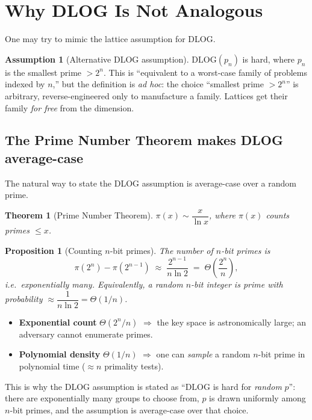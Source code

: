 \documentclass[11pt]{article}
\theoremstyle{definition}
\newtheorem{assumption}[definition]{Assumption}
\theoremstyle{plain}
\newtheorem{theorem}[definition]{Theorem}
\newtheorem{proposition}[definition]{Proposition}
\theoremstyle{remark}
\newcommand{\dlog}{\mathrm{DLOG}}
\begin{document}
\section{Why DLOG Is Not Analogous}

One may try to mimic the lattice assumption for DLOG.

\begin{assumption}[Alternative DLOG assumption]
$\dlog(p_n)$ is hard, where $p_n$ is the smallest prime $>2^n$. This is ``equivalent to a
worst-case family of problems indexed by $n$,'' but the definition is \emph{ad hoc}: the
choice ``smallest prime $>2^n$'' is arbitrary, reverse-engineered only to manufacture a
family. Lattices get their family \emph{for free} from the dimension.
\end{assumption}

\subsection{The Prime Number Theorem makes DLOG average-case}
\label{sec:pnt}

The natural way to state the DLOG assumption is average-case over a random prime.

\begin{theorem}[Prime Number Theorem]
$\pi(x) \sim \dfrac{x}{\ln x}$, where $\pi(x)$ counts primes $\le x$.
\end{theorem}

\begin{proposition}[Counting $n$-bit primes]
The number of $n$-bit primes is
\[
   \pi(2^n)-\pi(2^{n-1})
   \;\approx\; \frac{2^{n-1}}{n\ln 2}
   \;=\; \Theta\!\left(\frac{2^n}{n}\right),
\]
i.e.\ \emph{exponentially many}. Equivalently, a random $n$-bit integer is prime with
probability $\approx \dfrac{1}{n\ln 2} = \Theta(1/n)$.
\end{proposition}

\begin{keybox}
\begin{itemize}[leftmargin=1.4em,nosep]
  \item \textbf{Exponential count} $\Theta(2^n/n)$ $\Rightarrow$ the key space is astronomically
        large; an adversary cannot enumerate primes.
  \item \textbf{Polynomial density} $\Theta(1/n)$ $\Rightarrow$ one can \emph{sample} a random
        $n$-bit prime in polynomial time ($\approx n$ primality tests).
\end{itemize}
This is why the DLOG assumption is stated as ``$\dlog$ is hard for \emph{random} $p$'':
there are exponentially many groups to choose from, $p$ is drawn uniformly among $n$-bit
primes, and the assumption is average-case over that choice.
\end{keybox}
\end{document}
